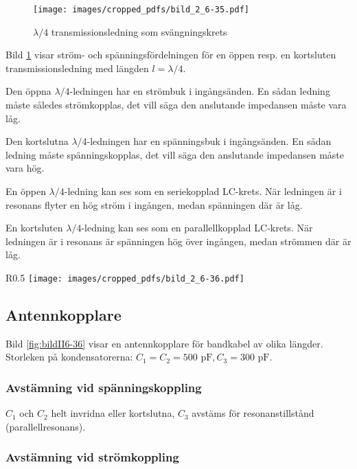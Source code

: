 \begin{figure}
  \texttt{[image: images/cropped\_pdfs/bild\_2\_6-35.pdf]}
  \caption{$\lambda/4$ transmissionsledning som svängningskrets}
  \label{fig:bildII6-35}
\end{figure}

Bild \ref{fig:bildII6-35} visar ström- och spänningsfördelningen för en öppen
resp. en kortsluten transmissionsledning med längden \(l = \lambda/4\).

Den öppna \(\lambda/4\)-ledningen har en strömbuk i ingångsänden.
En sådan ledning måste således strömkopplas, det vill säga den anslutande
impedansen måste vara låg.

Den kortslutna \(\lambda/4\)-ledningen har en spänningsbuk i ingångsänden.
En sådan ledning måste spänningskopplas, det vill säga den anslutande impedansen måste
vara hög.

En öppen \(\lambda/4\)-ledning kan ses som en seriekopplad LC-krets.
När ledningen är i resonans flyter en hög ström i ingången, medan spänningen
där är låg.

En kortsluten \(\lambda/4\)-ledning kan ses som en parallellkopplad LC-krets.
När ledningen är i resonans är spänningen hög över ingången, medan strömmen där
är låg.

\clearpage %
%
\begin{wrapfigure}[35]{R}{0.5\textwidth}
  \texttt{[image: images/cropped\_pdfs/bild\_2\_6-36.pdf]}
  \caption{Antennkopplare}
  \label{fig:bildII6-36}
\end{wrapfigure}
%
\subsection{Antennkopplare}

Bild \ref{fig:bildII6-36} visar en antennkopplare för bandkabel av olika
längder. Storleken på kondensatorerna: \(C_1 = C_2 = 500\text{ pF},
C_3 = 300\text{ pF}\).

\subsubsection{Avstämning vid spänningskoppling}

\(C_1\) och \(C_2\) helt invridna eller kortslutna, \(C_3\) avstäms
för resonanstillstånd (parallellresonans).

\subsubsection{Avstämning vid strömkoppling}

